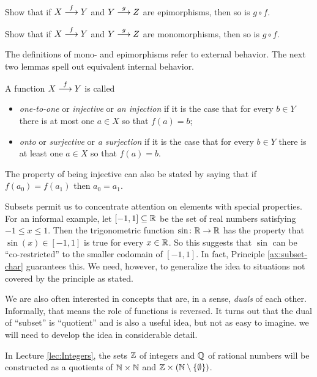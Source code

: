 \begin{exercises}
	\begin{firstexercise}
		\item Show that if $\sfromto fXY$ and $\sfromto gYZ$ are epimorphisms, then so is $g\circ f$. 
		\item Show that if $\sfromto fXY$ and $\sfromto gYZ$ are monomorphisms, then so is $g\circ f$. 
	\end{firstexercise}
\end{exercises}

The definitions of mono- and epimorphisms refer to external behavior. The next two lemmas spell out equivalent internal behavior.

\begin{defn}
	A function $\sfromto fXY$ is called
	\begin{itemize}
		\item \emph{one-to-one} or \emph{injective} or \emph{an injection} if it is the case that for every $b\in Y$ there is at most one $a\in X$ so that $f(a)=b$;
		\item \emph{onto} or \emph{surjective} or \emph{a surjection} if it is the case that for every $b\in Y$ there is at least one $a\in X$ so that $f(a)=b$.
	\end{itemize}
\end{defn}

The property of being injective can also be stated by saying that if $f(a_0)=f(a_1)$ then $a_0=a_1$.

Subsets permit us to concentrate attention on elements with special properties.
For an informal example, let $[-1,1]\subseteq\RR$ be the set of real numbers satisfying $-1\leq x\leq 1$.
Then the trigonometric function $\fromto \sin\RR\RR$ has the property that $\sin(x)\in [-1,1]$ is true for every $x\in\RR$.
So this suggests that $\sin$ can be ``co-restricted'' to the smaller codomain of $[-1,1]$. In fact, Principle \ref{ax:subset-char} guarantees this.
We need, however, to generalize the idea to situations not covered by the principle as stated.

We are also often interested in concepts that are, in a sense, \emph{duals} of each other. 
Informally, that means the role of functions is reversed.
It turns out that the dual of ``subset'' is ``quotient'' and is also a useful idea, but not as easy to imagine. we will need to develop the idea in considerable detail.

In Lecture \ref{lec:Integers}, the sets $\ZZ$ of integers and $\QQ$ of rational numbers will be constructed as a quotients of $\NN\times \NN$ and $\ZZ\times (\NN\setminus\{\emptyset\})$.

